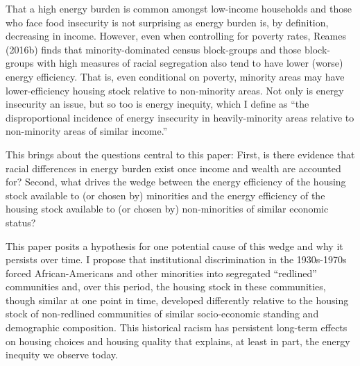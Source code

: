 \documentclass[
]{article}
\begin{document}
That a high energy burden is common amongst low-income households and
those who face food insecurity is not surprising as energy burden is, by
definition, decreasing in income. However, even when controlling for
poverty rates, Reames (2016b) finds that minority-dominated census
block-groups and those block-groups with high measures of racial
segregation also tend to have lower (worse) energy efficiency. That is,
even conditional on poverty, minority areas may have lower-efficiency
housing stock relative to non-minority areas. Not only is energy
insecurity an issue, but so too is energy inequity, which I define as
``the disproportional incidence of energy insecurity in heavily-minority
areas relative to non-minority areas of similar income.''

This brings about the questions central to this paper: First, is there
evidence that racial differences in energy burden exist once income and
wealth are accounted for? Second, what drives the wedge between the
energy efficiency of the housing stock available to (or chosen by)
minorities and the energy efficiency of the housing stock available to
(or chosen by) non-minorities of similar economic status?

This paper posits a hypothesis for one potential cause of this wedge and
why it persists over time. I propose that institutional discrimination
in the 1930s-1970s forced African-Americans and other minorities into
segregated ``redlined'' communities and, over this period, the housing
stock in these communities, though similar at one point in time,
developed differently relative to the housing stock of non-redlined
communities of similar socio-economic standing and demographic
composition. This historical racism has persistent long-term effects on
housing choices and housing quality that explains, at least in part, the
energy inequity we observe today.
\end{document}
